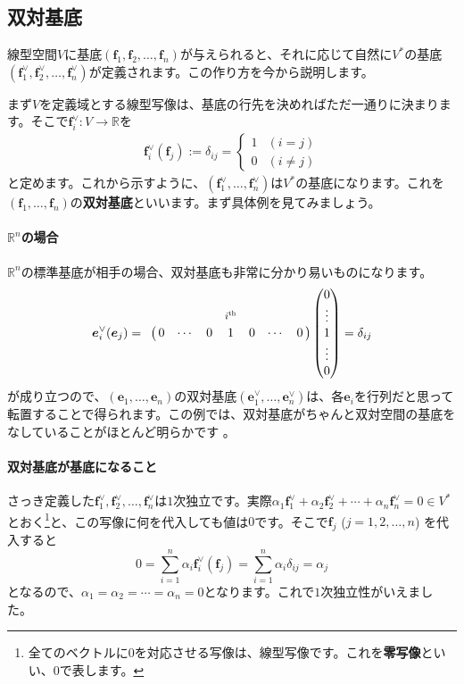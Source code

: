 \subsection{双対基底}

線型空間$V$に基底$(\bm{f}_1, \bm{f}_2, \ldots, \bm{f}_n)$が与えられると、それに応じて自然に$V^*$の基底$(\bm{f}^{\vee}_1, \bm{f}^{\vee}_2, \ldots, \bm{f}^{\vee}_n)$が定義されます。この作り方を今から説明します。

まず$V$を定義域とする線型写像は、基底の行先を決めればただ一通りに決まります。そこで$\bm{f}^{\vee}_i\colon V \rightarrow\mathbb{R}$を
\begin{align*}
\bm{f}^{\vee}_i(\bm{f}_j) := \delta_{ij} =
\begin{cases}
1 & (i = j) \\
0 & (i \neq j)
\end{cases}
\end{align*}
と定めます。これから示すように、$(\bm{f}^{\vee}_1, \ldots, \bm{f}^{\vee}_n)$は$V^*$の基底になります。これを$(\bm{f}_1, \ldots, \bm{f}_n)$の\textbf{双対基底}といいます。まず具体例を見てみましょう。

\paragraph{$\mathbb{R}^n$の場合} $\mathbb{R}^n$の標準基底が相手の場合、双対基底も非常に分かり易いものになります。
\[
\bm{e}^{\vee}_i (\bm{e}_j)
=
\bordermatrix{
& & & & \scalebox{0.8}{$i^{\text{th}}$} \cr
& 0 & \cdots & 0 & 1 & 0 & \cdots & 0
}
\begin{pmatrix}
0 \\
\vdots \\
1 \\
\vdots \\
0
\end{pmatrix}
= \delta_{ij}
\]
が成り立つので、$(\bm{e}_1, \ldots, \bm{e}_n)$の双対基底$(\bm{e}^{\vee}_1, \ldots, \bm{e}^{\vee}_n)$は、各$\bm{e}_i$を行列だと思って転置することで得られます。この例では、双対基底がちゃんと双対空間の基底をなしていることがほとんど明らかです	。

\paragraph{双対基底が基底になること} さっき定義した$\bm{f}^{\vee}_1, \bm{f}^{\vee}_2, \ldots, \bm{f}^{\vee}_n$は$1$次独立です。実際$\alpha_1 \bm{f}^{\vee}_1 + \alpha_2 \bm{f}^{\vee}_2 + \cdots + \alpha_n \bm{f}^{\vee}_n = 0 \in V^*$とおく\footnote{全てのベクトルに$0$を対応させる写像は、線型写像です。これを\textbf{零写像}といい、$0$で表します。}と、この写像に何を代入しても値は$0$です。そこで$\bm{f}_j$ ($j = 1, 2, \ldots, n$) を代入すると
\[
0 = \sum_{i = 1}^n \alpha_i \bm{f}^{\vee}_i (\bm{f}_j) = \sum_{i = 1}^n \alpha_i \delta_{ij} = \alpha_j
\]
となるので、$\alpha_1 = \alpha_2 = \cdots = \alpha_n = 0$となります。これで$1$次独立性がいえました。

